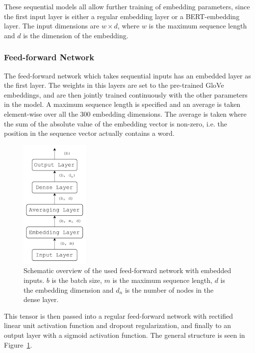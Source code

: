 These sequential models all allow further training of embedding parameters, since the first input layer is either a regular embedding layer or a BERT-embedding layer. The input dimensions are $w \times d$, where $w$ is the maximum sequence length and $d$ is the dimension of the embedding. 

\subsubsection*{Feed-forward Network}

The feed-forward network which takes sequential inputs has an embedded layer as the first layer. The weights in this layers are set to the pre-trained GloVe embeddings, and are then jointly trained continuously with the other parameters in the model. A maximum sequence length is specified and an average is taken element-wise over all the 300 embedding dimensions. The average is taken where the sum of the absolute value of the embedding vector is non-zero, i.e. the position in the sequence vector actually contains a word.

\begin{figure}[H]
    \centering
    \includegraphics[width=0.3\textwidth]{Figures/figs-ff_emb.pdf}
    \caption{Schematic overview of the used feed-forward network with embedded inputs. $b$ is the batch size, $m$ is the maximum sequence length, $d$ is the embedding dimension and $d_n$ is the number of nodes in the dense layer.}
\label{fig:emb_ff}
\end{figure}

This tensor is then passed into a regular feed-forward network with rectified linear unit activation function and dropout regularization, and finally to an output layer with a sigmoid activation function. The general structure is seen in Figure~\ref{fig:emb_ff}. 

